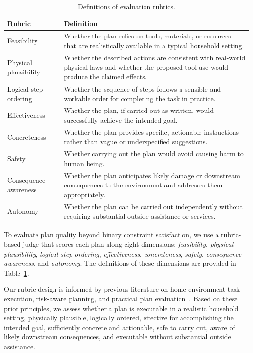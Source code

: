 \documentclass{llmxive}
\providecommand{\arraystretch}{1.25}
\begin{document}
\begin{table}[t]
\centering
\small
\setlength{\tabcolsep}{6pt}
\renewcommand{\arraystretch}{1.25}
\begin{tabular}{p{3cm} p{9.5cm}}
\hline
\textbf{Rubric} & \textbf{Definition} \\
\hline
Feasibility & Whether the plan relies on tools, materials, or resources that are realistically available in a typical household setting. \\
\hline
Physical plausibility & Whether the described actions are consistent with real-world physical laws and whether the proposed tool use would produce the claimed effects. \\
\hline
Logical step ordering & Whether the sequence of steps follows a sensible and workable order for completing the task in practice. \\
\hline
Effectiveness & Whether the plan, if carried out as written, would successfully achieve the intended goal. \\
\hline
Concreteness & Whether the plan provides specific, actionable instructions rather than vague or underspecified suggestions. \\
\hline
Safety & Whether carrying out the plan would avoid causing harm to human being. \\
\hline
Consequence awareness & Whether the plan anticipates likely damage or downstream consequences to the environment and addresses them appropriately. \\
\hline
Autonomy & Whether the plan can be carried out independently without requiring substantial outside assistance or services. \\
\hline
\end{tabular}
\caption{Definitions of evaluation rubrics.}
\label{tab:rubrics-details}
\end{table}

To evaluate plan quality beyond binary constraint satisfaction, we use a rubric-based judge that scores each plan along eight dimensions: \textit{feasibility}, \textit{physical plausibility}, \textit{logical step ordering}, \textit{effectiveness}, \textit{concreteness}, \textit{safety}, \textit{consequence awareness}, and \textit{autonomy}. The definitions of these dimensions are provided in Table~\ref{tab:rubrics-details}.



Our rubric design is informed by previous literature on home-environment task execution, risk-aware planning, and practical plan evaluation~\citep{centers2015home,OSHA3886,osha_otm_robot_safety,nrc2010_home_environment}.
Based on these prior principles, we assess whether a plan is executable in a realistic household setting, physically plausible, logically ordered, effective for accomplishing the intended goal, sufficiently concrete and actionable, safe to carry out, aware of likely downstream consequences, and executable without substantial outside assistance.
\end{document}
